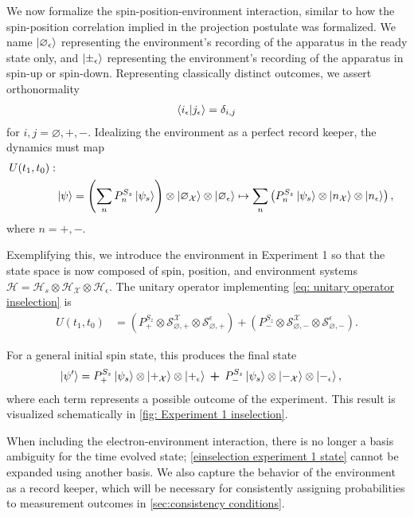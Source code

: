 We now formalize the spin-position-environment interaction, similar to how the spin-position correlation implied in the projection postulate was formalized. We name $\ket{\varnothing_\epsilon}$ representing the environment's recording of the apparatus in the ready state only, and $\ket{\pm_\epsilon}$ representing the environment's recording of the apparatus in spin-up or spin-down. Representing classically distinct outcomes, we assert orthonormality
\begin{align}
  \braket{i_\epsilon | j_\epsilon} = \delta_{i,j}
\end{align}
for $i,j = \varnothing, +, -$.
Idealizing the environment as a perfect record keeper, the dynamics must map
\begin{align} \label{eq: unitary operator inselection}
    \nonumber U(t_1, t_0): \\
    & \ket{\psi} = \left(\sum_{n} P^{S_z}_n\ket{\psi_s}\right) \otimes \ket{\varnothing_\mathcal{X}} \otimes \ket{\varnothing_\epsilon} \mapsto \sum_{n}\left(P^{S_z}_n\ket{\psi_s} \otimes \ket{n_\mathcal{X}} \otimes \ket{n_\epsilon} \right),
\end{align}
where $n= +,-$.

Exemplifying this, we introduce the environment in Experiment 1 so that the state space is now composed of spin, position, and environment systems $\mathcal{H} = \mathcal{H}_s \otimes \mathcal{H}_\mathcal{X} \otimes \mathcal{H}_\epsilon$. The unitary operator implementing \autoref{eq: unitary operator inselection} is
\begin{align} \label{einselection experiment 1}
  U(t_1, t_0) &= \left(P^{S_z}_+ \otimes \mathcal{S}^\mathcal{X}_{\varnothing, +} \otimes \mathcal{S}^\epsilon_{\varnothing, +} \right) + \left(P^{S_z}_- \otimes \mathcal{S}^\mathcal{X}_{\varnothing, -} \otimes \mathcal{S}^\epsilon_{\varnothing, -} \right).
\end{align}

For a general initial spin state, this produces the final state
\begin{align} \label{einselection experiment 1 state}
  \ket{\psi'} &= P^{S_z}_+ \ket{\psi_s} \otimes \ket{+_{\mathcal{X}}} \otimes \ket{+_\epsilon} \: \bm{+} \: P^{S_z}_- \ket{\psi_s} \otimes \ket{-_{\mathcal{X}}} \otimes \ket{-_\epsilon},
\end{align}
where each term represents a possible outcome of the experiment. This result is visualized schematically in \autoref{fig: Experiment 1 inselection}.

When including the electron-environment interaction, there is no longer a basis ambiguity for the time evolved state; \autoref{einselection experiment 1 state} cannot be expanded using another basis. We also capture the behavior of the environment as a record keeper, which will be necessary for consistently assigning probabilities to measurement outcomes in \autoref{sec:consistency conditions}.


